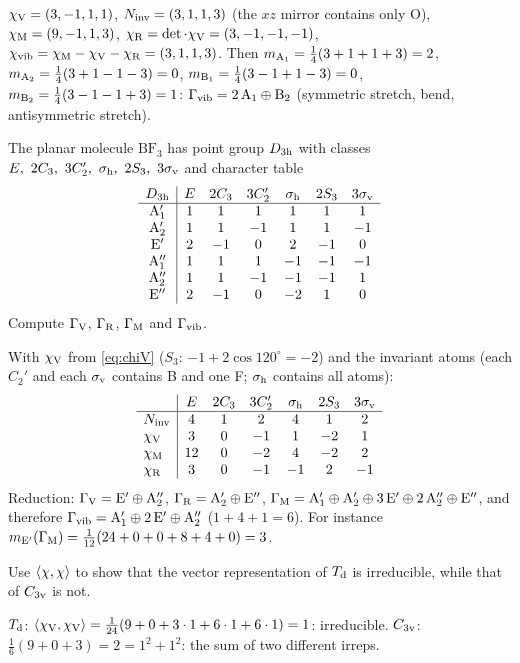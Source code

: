\begin{solution}
$\chi_{\mathrm{V}}=(3,-1,1,1)$, $N_{\mathrm{inv}}=(3,1,1,3)$ (the $xz$ mirror contains only O),
$\chi_{\mathrm{M}}=(9,-1,1,3)$, $\chi_{\mathrm{R}}=\det\cdot\chi_{\mathrm{V}}=(3,-1,-1,-1)$,
$\chi_{\mathrm{vib}}=\chi_{\mathrm{M}}-\chi_{\mathrm{V}}-\chi_{\mathrm{R}}=(3,1,1,3)$. Then
$m_{\mathrm{A}_1}=\tfrac14(3+1+1+3)=2$, $m_{\mathrm{A}_2}=\tfrac14(3+1-1-3)=0$,
$m_{\mathrm{B}_1}=\tfrac14(3-1+1-3)=0$, $m_{\mathrm{B}_2}=\tfrac14(3-1-1+3)=1$:
$\Gamma_{\mathrm{vib}}=2\,\mathrm{A}_1\oplus\mathrm{B}_2$ (symmetric stretch, bend, antisymmetric stretch).
\end{solution}

\begin{exercise}\label{ex:2:BF3}
The planar molecule $\mathrm{BF_3}$ has point group $D_{3\mathrm{h}}$ with classes
$E,\ 2C_3,\ 3C_2',\ \sigma_{\mathrm{h}},\ 2S_3,\ 3\sigma_{\mathrm{v}}$ and character table
\[
\begin{array}{c|cccccc}
D_{3\mathrm{h}}& E & 2C_3 & 3C_2' & \sigma_{\mathrm{h}} & 2S_3 & 3\sigma_{\mathrm{v}}\\\hline
\mathrm{A}_1' &1&1&1&1&1&1\\
\mathrm{A}_2' &1&1&-1&1&1&-1\\
\mathrm{E}' &2&-1&0&2&-1&0\\
\mathrm{A}_1''&1&1&1&-1&-1&-1\\
\mathrm{A}_2''&1&1&-1&-1&-1&1\\
\mathrm{E}''&2&-1&0&-2&1&0
\end{array}
\]
Compute $\Gamma_{\mathrm{V}}$, $\Gamma_{\mathrm{R}}$, $\Gamma_{\mathrm{M}}$ and $\Gamma_{\mathrm{vib}}$.
\end{exercise}

\begin{solution}
With $\chi_{\mathrm{V}}$ from \eqref{eq:chiV} ($S_3$: $-1+2\cos120^\circ=-2$) and the invariant atoms
(each $C_2'$ and each $\sigma_{\mathrm{v}}$ contains B and one F; $\sigma_{\mathrm{h}}$ contains all atoms):
\[
\begin{array}{l|cccccc}
 & E&2C_3&3C_2'&\sigma_{\mathrm{h}}&2S_3&3\sigma_{\mathrm{v}}\\\hline
N_{\mathrm{inv}} &4&1&2&4&1&2\\
\chi_{\mathrm{V}} &3&0&-1&1&-2&1\\
\chi_{\mathrm{M}} &12&0&-2&4&-2&2\\
\chi_{\mathrm{R}} &3&0&-1&-1&2&-1
\end{array}
\]
Reduction: $\Gamma_{\mathrm{V}}=\mathrm{E}'\oplus\mathrm{A}_2''$, $\Gamma_{\mathrm{R}}=\mathrm{A}_2'\oplus\mathrm{E}''$,
$\Gamma_{\mathrm{M}}=\mathrm{A}_1'\oplus\mathrm{A}_2'\oplus3\,\mathrm{E}'\oplus2\,\mathrm{A}_2''\oplus\mathrm{E}''$, and
therefore $\Gamma_{\mathrm{vib}}=\mathrm{A}_1'\oplus2\,\mathrm{E}'\oplus\mathrm{A}_2''$ ($1+4+1=6$). For instance
$m_{\mathrm{E}'}(\Gamma_{\mathrm{M}})=\tfrac1{12}(24+0+0+8+4+0)=3$.
\end{solution}

\begin{exercise}\label{ex:2:irredtest}
Use $\langle \chi, \chi\rangle$ to show that the vector representation of $T_{\mathrm{d}}$ is
irreducible, while that of $C_{3\mathrm{v}}$ is not.
\end{exercise}

\begin{solution}
$T_{\mathrm{d}}$: $\langle \chi_{\mathrm{V}}, \chi_{\mathrm{V}}\rangle=\tfrac1{24}(9+0+3\cdot1+6\cdot1+6\cdot1)=1$: irreducible.
$C_{3\mathrm{v}}$: $\tfrac16(9+0+3)=2=1^2+1^2$: the sum of two different irreps.
\end{solution}
